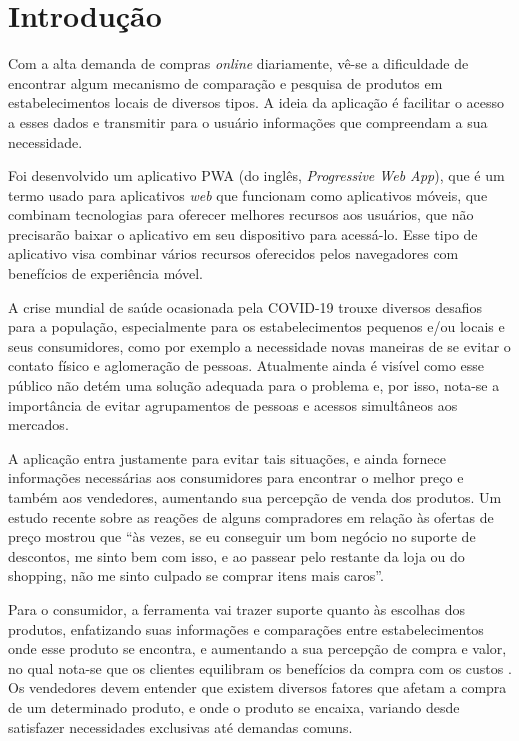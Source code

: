 \section{Introdução}
\label{sec:introducao}

Com a alta demanda de compras \textit{online} diariamente, vê-se a dificuldade de encontrar algum mecanismo de comparação e pesquisa de produtos em estabelecimentos locais de diversos tipos. A ideia da aplicação é facilitar o acesso a esses dados e transmitir para o usuário informações que compreendam a sua necessidade.

Foi desenvolvido um aplicativo PWA (do inglês, \textit{Progressive Web App}), que é um termo usado para aplicativos \textit{web} que funcionam como aplicativos móveis, que combinam tecnologias para oferecer melhores recursos aos usuários, que não precisarão baixar o aplicativo em seu dispositivo para acessá-lo. Esse tipo de aplicativo visa combinar vários recursos oferecidos pelos navegadores com benefícios de experiência móvel. {\cite{souza2017pwa}}

A crise mundial de saúde ocasionada pela COVID-19 trouxe diversos desafios para a população, especialmente para os estabelecimentos pequenos e/ou locais e seus consumidores, como por exemplo a necessidade novas maneiras de se evitar o contato físico e aglomeração de pessoas. Atualmente ainda é visível como esse público não detém uma solução adequada para o problema e, por isso, nota-se a importância de evitar agrupamentos de pessoas e acessos simultâneos aos mercados.

A aplicação entra justamente para evitar tais situações, e ainda fornece informações necessárias aos consumidores para encontrar o melhor preço e também aos vendedores, aumentando sua percepção de venda dos produtos. Um estudo recente sobre as reações de alguns compradores em relação às ofertas de preço mostrou que ``às vezes, se eu conseguir um bom negócio no suporte de descontos, me sinto bem com isso, e  ao passear pelo restante da loja ou do shopping, não me sinto culpado se comprar itens mais caros''. {\cite{grewal1998effects}} 

Para o consumidor, a ferramenta vai trazer suporte quanto às escolhas dos produtos, enfatizando suas informações e comparações entre estabelecimentos onde esse produto se encontra, e aumentando a sua percepção de compra e valor, no qual nota-se que os clientes equilibram os benefícios da compra com os custos \cite{grewal1998effects}. Os vendedores devem entender que existem diversos fatores que afetam a compra de um determinado produto, e onde o produto se encaixa, variando desde satisfazer necessidades exclusivas até demandas comuns. \cite{grewal1998effects}
